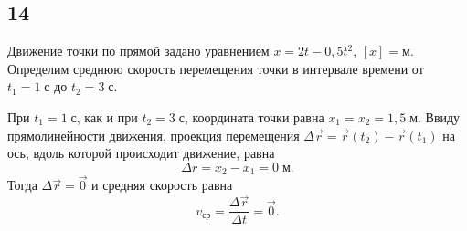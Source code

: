 \subsection{14}

Движение точки по прямой задано уравнением $x=2t-0{,}5t^2$, $[x]=\text{м}$. Определим среднюю скорость перемещения точки в интервале времени от $t_1=1\;\text{с}$ до $t_2=3\;\text{с}$.

При $t_1=1\;\text{с}$, как и при $t_2=3\;\text{с}$, координата точки равна $x_1=x_2=1{,}5\;\text{м}$. Ввиду прямолинейности движения, проекция перемещения $\Delta \vec r=\vec r(t_2)-\vec r(t_1)$ на ось, вдоль которой происходит движение, равна
\[
\Delta r=x_2-x_1=0\;\text{м}.
\]
Тогда $\Delta\vec r=\vec 0$ и средняя скорость равна
\[
v_\text{ср}=\frac{\Delta\vec r}{\Delta t}=\vec0.
\]